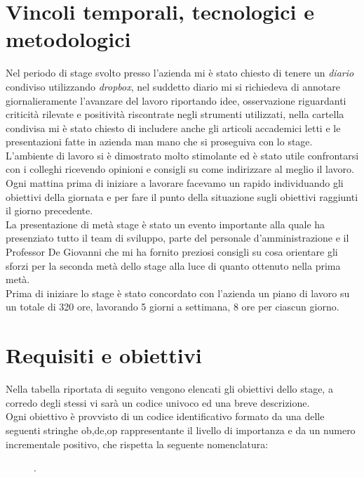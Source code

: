 \section{Vincoli temporali, tecnologici e metodologici}
Nel periodo di stage svolto presso l'azienda mi è stato chiesto di tenere un \textit{diario} condiviso utilizzando \textit{dropbox}, nel suddetto diario mi si richiedeva di annotare giornalieramente l'avanzare del lavoro riportando idee, osservazione riguardanti criticità rilevate e positività riscontrate negli strumenti utilizzati, nella cartella condivisa mi è stato chiesto di includere anche gli articoli accademici letti e le presentazioni fatte in azienda man mano che si proseguiva con lo stage.\\
L'ambiente di lavoro si è dimostrato molto stimolante ed è stato utile confrontarsi con i colleghi ricevendo opinioni e consigli su come indirizzare al meglio il lavoro. Ogni mattina prima di iniziare a lavorare facevamo un rapido  individuando gli obiettivi della giornata e per fare il punto della situazione sugli obiettivi raggiunti il giorno precedente.\\
La presentazione di metà stage è stato un evento importante alla quale ha presenziato tutto il team di sviluppo, parte del personale d'amministrazione e il Professor De Giovanni che mi ha fornito preziosi consigli su cosa orientare gli sforzi per la seconda metà dello stage alla luce di quanto ottenuto nella prima metà.\\
Prima di iniziare lo stage è stato concordato con l'azienda un piano di lavoro su un totale di 320 ore, lavorando 5 giorni a settimana, 8 ore per ciascun giorno. 

\section{Requisiti e obiettivi}
Nella tabella riportata di seguito vengono elencati gli obiettivi dello stage, a corredo degli stessi vi sarà un codice univoco ed una breve descrizione.\\
Ogni obiettivo è provvisto di un codice identificativo formato da una delle seguenti stringhe ob,de,op rappresentante il livello di importanza e da un numero incrementale positivo, che rispetta la seguente nomenclatura: 
\begin{figure}[htp]
	\centering
	[importanza][identificativo].
\end{figure}

